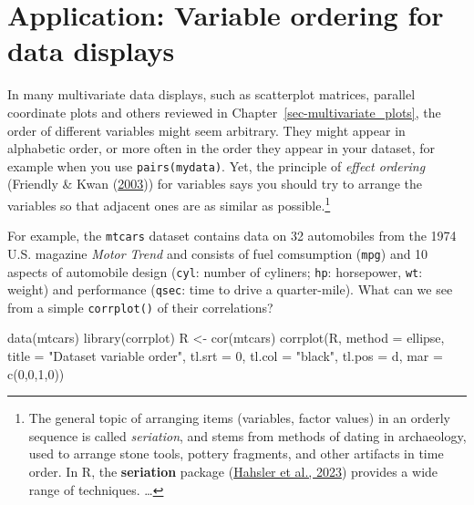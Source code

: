 \documentclass[
  letterpaper,
  10pt,
  krantz2]{krantz}
\makeatletter
\newenvironment{Shaded}{\begin{snugshade}}{\end{snugshade}}
\newcommand{\AttributeTok}[1]{\textcolor[rgb]{0.40,0.45,0.13}{#1}}
\newcommand{\DecValTok}[1]{\textcolor[rgb]{0.68,0.00,0.00}{#1}}
\newcommand{\FunctionTok}[1]{\textcolor[rgb]{0.28,0.35,0.67}{#1}}
\newcommand{\NormalTok}[1]{\textcolor[rgb]{0.00,0.23,0.31}{#1}}
\newcommand{\OtherTok}[1]{\textcolor[rgb]{0.00,0.23,0.31}{#1}}
\newcommand{\StringTok}[1]{\textcolor[rgb]{0.13,0.47,0.30}{#1}}
\newenvironment{kframe}{%
  \medskip{}
  \setlength{\fboxsep}{.8em}
  \def\at@end@of@kframe{}%
  \ifinner\ifhmode%
  \def\at@end@of@kframe{\end{minipage}}%
  \begin{minipage}{\columnwidth}%
  \fi\fi%
  \def\FrameCommand##1{\hskip\@totalleftmargin \hskip-\fboxsep
  \colorbox{shadecolor}{##1}\hskip-\fboxsep
      \hskip-\linewidth \hskip-\@totalleftmargin \hskip\columnwidth}%
  \MakeFramed {\advance\hsize-\width
    \@totalleftmargin\z@ \linewidth\hsize
    \@setminipage}}%
{\par\unskip\endMakeFramed%
  \at@end@of@kframe}
\renewenvironment{Shaded}{\begin{kframe}}{\end{kframe}}
\makeatother
\begin{document}
\hypertarget{sec-var-order}{%
\section{Application: Variable ordering for data
displays}\label{sec-var-order}}

In many multivariate data displays, such as scatterplot matrices,
parallel coordinate plots and others reviewed in
Chapter~\ref{sec-multivariate_plots}, the order of different variables
might seem arbitrary. They might appear in alphabetic order, or more
often in the order they appear in your dataset, for example when you use
\texttt{pairs(mydata)}. Yet, the principle of \emph{effect ordering}
(Friendly \& Kwan
(\protect\hyperlink{ref-FriendlyKwan:03:effect}{2003})) for variables
says you should try to arrange the variables so that adjacent ones are
as similar as possible.\footnote{The general topic of arranging items
  (variables, factor values) in an orderly sequence is called
  \emph{seriation}, and stems from methods of dating in archaeology,
  used to arrange stone tools, pottery fragments, and other artifacts in
  time order. In R, the \textbf{seriation} package
  (\protect\hyperlink{ref-R-seriation}{Hahsler et al., 2023}) provides a
  wide range of techniques. \ldots{}}

For example, the \texttt{mtcars} dataset contains data on 32 automobiles
from the 1974 U.S. magazine \emph{Motor Trend} and consists of fuel
comsumption (\texttt{mpg}) and 10 aspects of automobile design
(\texttt{cyl}: number of cyliners; \texttt{hp}: horsepower, \texttt{wt}:
weight) and performance (\texttt{qsec}: time to drive a quarter-mile).
What can we see from a simple \texttt{corrplot()} of their correlations?

\begin{Shaded}
\begin{Highlighting}[]
\FunctionTok{data}\NormalTok{(mtcars)}
\FunctionTok{library}\NormalTok{(corrplot)}
\NormalTok{R }\OtherTok{\textless{}{-}} \FunctionTok{cor}\NormalTok{(mtcars)}
\FunctionTok{corrplot}\NormalTok{(R, }
         \AttributeTok{method =} \StringTok{\textquotesingle{}ellipse\textquotesingle{}}\NormalTok{,}
         \AttributeTok{title =} \StringTok{"Dataset variable order"}\NormalTok{,}
         \AttributeTok{tl.srt =} \DecValTok{0}\NormalTok{, }\AttributeTok{tl.col =} \StringTok{"black"}\NormalTok{, }\AttributeTok{tl.pos =} \StringTok{\textquotesingle{}d\textquotesingle{}}\NormalTok{,}
         \AttributeTok{mar =} \FunctionTok{c}\NormalTok{(}\DecValTok{0}\NormalTok{,}\DecValTok{0}\NormalTok{,}\DecValTok{1}\NormalTok{,}\DecValTok{0}\NormalTok{))}
\end{Highlighting}
\end{Shaded}
\end{document}
